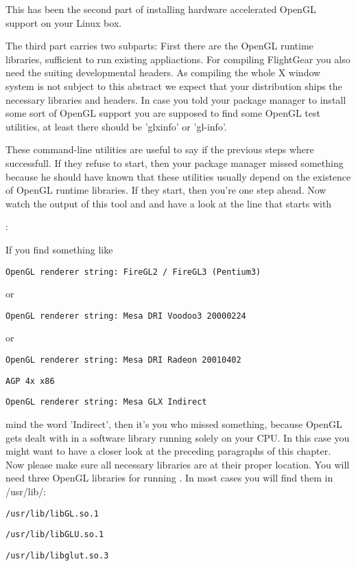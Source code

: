 This has been the second part of installing hardware accelerated OpenGL
support on your Linux box.

The third part carries two subparts: First there are the OpenGL runtime
libraries, sufficient to run existing appliactions. For compiling FlightGear you also need the suiting developmental headers.
As compiling the whole X window system is not subject to this abstract we
expect that your distribution ships the necessary libraries and headers. In
case you told your package manager to install some sort of OpenGL support
you are supposed to find some OpenGL test utilities, at least there should
be 'glxinfo' or 'gl-info'.

These command-line utilities are useful to say if the previous steps where
successfull. If they refuse to start, then your package manager missed
something because he should have known that these utilities usually depend
on the existence of OpenGL runtime libraries. If they start, then you're one
step ahead. Now watch the output of this tool and and have a look at the
line that starts with

:

If you find something like
\medskip

  \texttt{OpenGL renderer string: FireGL2 / FireGL3 (Pentium3)}
  \medskip

\noindent
or
\medskip

  \texttt{OpenGL renderer string: Mesa DRI Voodoo3 20000224}
  \medskip

\noindent
or
\medskip

  \texttt{OpenGL renderer string: Mesa DRI Radeon 20010402}
    
  \texttt{AGP 4x x86}
  \medskip

  \texttt{OpenGL renderer string: Mesa GLX Indirect}
  \medskip

\noindent
mind the word 'Indirect', then it's you who missed something, because OpenGL
gets dealt with in a software library running solely on your CPU. In this
case you might want to have a closer look at the preceding paragraphs of
this chapter. Now please make sure all necessary libraries are at their
proper location.
You will need three OpenGL libraries for running \FlightGear{}. In most cases
you will find them in /usr/lib/:

\texttt{/usr/lib/libGL.so.1}

\texttt{/usr/lib/libGLU.so.1}

\texttt{/usr/lib/libglut.so.3}

